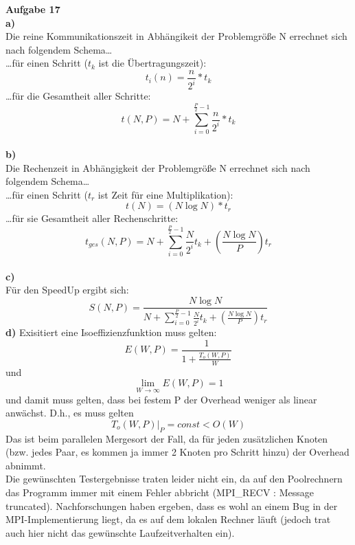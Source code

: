 \documentclass{article}
\begin{document}
\pagestyle{myheadings}
{\bf Aufgabe 17}\\
{\bf a)}\\
Die reine Kommunikationszeit in Abhängikeit der Problemgröße N errechnet sich nach folgendem Schema\ldots \\
\ldots für einen Schritt ($t_k$ ist die Übertragungszeit):
$$t_i(n) = \frac{n}{2^i}*t_k$$
\ldots für die Gesamtheit aller Schritte:
$$t(N,P) = N + \sum_{i=0}^{\frac{P}{2}-1}{\frac{n}{2^i}*t_k}$$
\\
{\bf b)}\\
Die Rechenzeit in Abhängigkeit der Problemgröße N errechnet sich nach folgendem Schema\ldots \\
\ldots für einen Schritt ($t_r$ ist Zeit für eine Multiplikation):
$$t(N) = (N\log{N})*t_r$$
\ldots für sie Gesamtheit aller Rechenschritte:
$$t_{ges}(N,P) = N + \sum_{i=0}^{\frac{P}{2}-1}{\frac{N}{2^i}}t_k + (\frac{N\log{N}}{P})t_r$$
\\
{\bf c)}\\
Für den SpeedUp ergibt sich:
$$S(N,P) = \frac{N\log{N}}{N + \sum_{i=0}^{\frac{P}{2}-1}{\frac{N}{2^i}}t_k + (\frac{N\log{N}}{P})t_r}$$
{\bf d)}
Exisitiert eine Isoeffizienzfunktion muss gelten:
$$E(W,P) =  \frac{1}{1+\frac{T_o(W,P)}{W}}$$
und
$$\lim\limits_{W \rightarrow \infty} E(W,P)=1$$
und damit muss gelten, dass bei festem P der Overhead weniger als linear 
anwächst. D.h., es muss gelten
$$T_o(W,P)|_P=const < O(W)$$
Das ist beim parallelen Mergesort der Fall, da für jeden zusätzlichen 
Knoten (bzw. jedes Paar, es kommen ja immer 2 Knoten pro Schritt hinzu) 
der Overhead abnimmt.\\
Die gewünschten Testergebnisse traten leider nicht ein, da auf den 
Poolrechnern das Programm immer mit einem Fehler abbricht (MPI\_RECV : 
Message truncated). 
Nachforschungen haben ergeben, dass es wohl an einem 
Bug in der MPI-Implementierung liegt, da es auf dem lokalen Rechner 
läuft (jedoch trat auch hier nicht das gewünschte Laufzeitverhalten 
ein).
\end{document}
